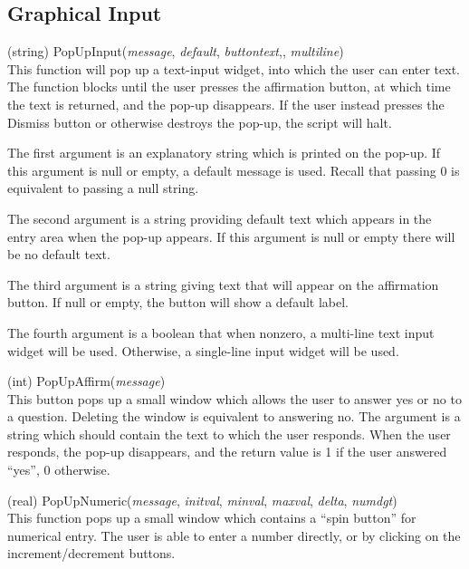 \subsection{Graphical Input}

\begin{description}
\item{(string) \vt PopUpInput({\it message\/}, {\it default\/},
 {\it buttontext\/},, {\it multiline\/})}\\
This function will pop up a text-input widget, into which the user can
enter text.  The function blocks until the user presses the
affirmation button, at which time the text is returned, and the pop-up
disappears.  If the user instead presses the {\cb Dismiss} button or
otherwise destroys the pop-up, the script will halt.

The first argument is an explanatory string which is printed on the
pop-up.  If this argument is null or empty, a default message is used. 
Recall that passing 0 is equivalent to passing a null string.

The second argument is a string providing default text which appears
in the entry area when the pop-up appears.  If this argument is null
or empty there will be no default text.
 
The third argument is a string giving text that will appear on the
affirmation button.  If null or empty, the button will show a default
label.

The fourth argument is a boolean that when nonzero, a multi-line text
input widget will be used.  Otherwise, a single-line input widget will
be used.

\item{(int) \vt PopUpAffirm({\it message\/})}\\
This button pops up a small window which allows the user to answer yes
or no to a question.  Deleting the window is equivalent to answering
no.  The argument is a string which should contain the text to which
the user responds.  When the user responds, the pop-up disappears, and
the return value is 1 if the user answered ``yes'', 0 otherwise.

\item{(real) \vt PopUpNumeric({\it message\/}, {\it initval\/},
 {\it minval\/}, {\it maxval\/}, {\it delta\/}, {\it numdgt\/})}\\
This function pops up a small window which contains a ``spin button''
for numerical entry.  The user is able to enter a number directly, or
by clicking on the increment/decrement buttons.


\end{description}
